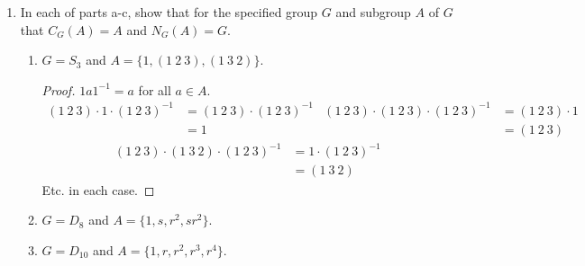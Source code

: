 \documentclass[../notes.tex]{subfiles}
\begin{document}
\begin{enumerate}[label={\textbf{\arabic*.}}]
\begin{proof}
        \begin{align*}
            (xy^{-1})b(xy^{-1})^{-1} &= xy^{-1}byx^{-1}\\
            &= xbx^{-1}\\
            &= b
        \end{align*}
        as desired.
    \end{proof}
    \item In each of parts a-c, show that for the specified group $G$ and subgroup $A$ of $G$ that $C_G(A)=A$ and $N_G(A)=G$.
    \begin{enumerate}[label={\textbf{(\alph*)}}]
        \item $G=S_3$ and $A=\{1,(1\ 2\ 3),(1\ 3\ 2)\}$.
        \begin{proof}
            $1a1^{-1}=a$ for all $a\in A$.
            \begin{align*}
                (1\ 2\ 3)\cdot 1\cdot(1\ 2\ 3)^{-1} &= (1\ 2\ 3)\cdot(1\ 2\ 3)^{-1}&
                    (1\ 2\ 3)\cdot (1\ 2\ 3)\cdot(1\ 2\ 3)^{-1} &= (1\ 2\ 3)\cdot 1\\
                &= 1&
                    &= (1\ 2\ 3)
            \end{align*}
            \begin{align*}
                (1\ 2\ 3)\cdot (1\ 3\ 2)\cdot(1\ 2\ 3)^{-1} &= 1\cdot(1\ 2\ 3)^{-1}\\
                &= (1\ 3\ 2)
            \end{align*}
            Etc. in each case.
        \end{proof}
        \item $G=D_8$ and $A=\{1,s,r^2,sr^2\}$.
        \item $G=D_{10}$ and $A=\{1,r,r^2,r^3,r^4\}$.
    \end{enumerate}
\end{enumerate}
\end{document}

